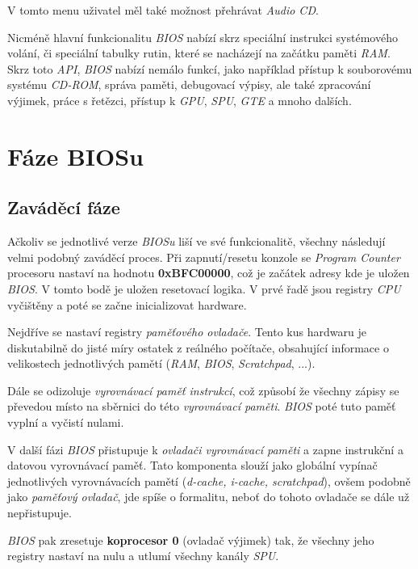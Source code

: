 V tomto menu uživatel měl také možnost přehrávat \textit{Audio CD}.

Nicméně hlavní funkcionalitu \textit{BIOS} nabízí skrz speciální instrukci systémového volání, či speciální
tabulky rutin, které se nacházejí na začátku paměti \textit{RAM}.
Skrz toto \textit{API}, \textit{BIOS} nabízí nemálo funkcí, jako například přístup k souborovému systému
\textit{CD-ROM}, správa paměti, debugovací výpisy, ale také zpracování výjimek, práce s řetězci, přístup k \textit{GPU}, \textit{SPU},
\textit{GTE} a mnoho dalších.

\section{Fáze BIOSu}

\subsection{Zaváděcí fáze}

Ačkoliv se jednotlivé verze \textit{BIOSu} liší ve své funkcionalitě, všechny následují velmi podobný
zaváděcí proces. Při zapnutí/resetu konzole se \textit{Program Counter} procesoru nastaví na hodnotu 
\textbf{0xBFC00000}, což je začátek adresy kde je uložen \textit{BIOS}. V tomto bodě je uložen resetovací
logika. V prvé řadě jsou registry \textit{CPU} vyčištěny a poté se začne inicializovat hardware.

Nejdříve se nastaví registry \textit{paměťového ovladače}. Tento kus hardwaru je diskutabilně do jisté míry ostatek z reálného
počítače, obsahující informace o velikostech jednotlivých pamětí (\textit{RAM}, \textit{BIOS}, \textit{Scratchpad}, ...).

Dále se odizoluje \textit{vyrovnávací paměť instrukcí}, což způsobí že všechny zápisy se převedou místo na 
sběrnici do této \textit{vyrovnávací paměti}. \textit{BIOS} poté tuto paměť vyplní a vyčistí nulami. 

V další fázi \textit{BIOS} přistupuje k \textit{ovladači vyrovnávací paměti} a zapne instrukční a datovou vyrovnávací paměť. 
Tato komponenta slouží jako globální vypínač jednotlivých vyrovnávacích pamětí (\textit{d-cache, i-cache, scratchpad}), ovšem podobně
jako \textit{paměťový ovladač}, jde spíše o formalitu, neboť do tohoto ovladače se dále už nepřistupuje.

\textit{BIOS} pak zresetuje \textbf{koprocesor 0} (ovladač výjimek) tak, že všechny jeho registry nastaví na nulu a
utlumí všechny kanály \textit{SPU}.

